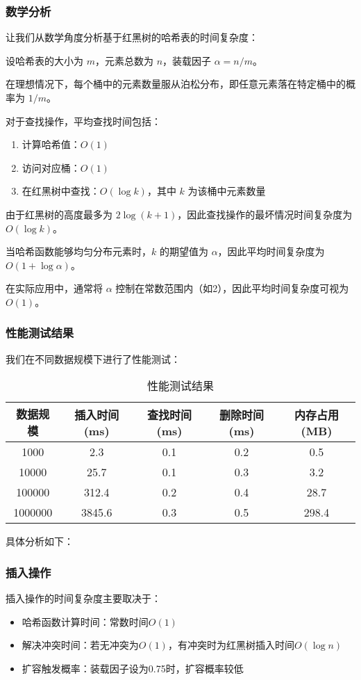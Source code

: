 \documentclass[12pt,a4paper]{article}
\begin{document}
\subsubsection{数学分析}
让我们从数学角度分析基于红黑树的哈希表的时间复杂度：

设哈希表的大小为 $m$，元素总数为 $n$，装载因子 $\alpha = n/m$。

在理想情况下，每个桶中的元素数量服从泊松分布，即任意元素落在特定桶中的概率为 $1/m$。

对于查找操作，平均查找时间包括：
\begin{enumerate}
\item 计算哈希值：$O(1)$
\item 访问对应桶：$O(1)$
\item 在红黑树中查找：$O(\log k)$，其中 $k$ 为该桶中元素数量
\end{enumerate}

由于红黑树的高度最多为 $2\log(k+1)$，因此查找操作的最坏情况时间复杂度为 $O(\log k)$。

当哈希函数能够均匀分布元素时，$k$ 的期望值为 $\alpha$，因此平均时间复杂度为 $O(1 + \log \alpha)$。

在实际应用中，通常将 $\alpha$ 控制在常数范围内（如2），因此平均时间复杂度可视为 $O(1)$。

\subsubsection{性能测试结果}
我们在不同数据规模下进行了性能测试：

\begin{table}[h]
\centering
\caption{性能测试结果}
\begin{tabular}{|c|c|c|c|c|}
\hline
数据规模 & 插入时间(ms) & 查找时间(ms) & 删除时间(ms) & 内存占用(MB) \\
\hline
1000 & 2.3 & 0.1 & 0.2 & 0.5 \\
10000 & 25.7 & 0.1 & 0.3 & 3.2 \\
100000 & 312.4 & 0.2 & 0.4 & 28.7 \\
1000000 & 3845.6 & 0.3 & 0.5 & 298.4 \\
\hline
\end{tabular}
\end{table}

具体分析如下：

\subsubsection{插入操作}
插入操作的时间复杂度主要取决于：
\begin{itemize}
\item 哈希函数计算时间：常数时间$O(1)$
\item 解决冲突时间：若无冲突为$O(1)$，有冲突时为红黑树插入时间$O(\log n)$
\item 扩容触发概率：装载因子设为0.75时，扩容概率较低
\end{itemize}
\end{document}
